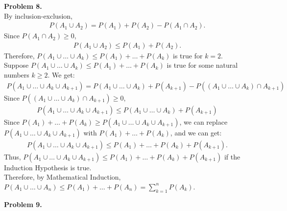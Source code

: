 \documentclass{article}
\begin{document}
\textbf{Problem 8.} \\
By inclusion-exclusion,
\begin{align}
    P(A_1 \cup A_2) = P(A_1) + P(A_2) - P(A_1 \cap A_2).
\end{align}
Since $P(A_1 \cap A_2) \ge 0$,
\begin{align}
    P(A_1 \cup A_2) \le P(A_1) + P(A_2).
\end{align}
Therefore, $P(A_1 \cup \dots \cup A_k) \le P(A_1) + \dots + P(A_k)$ is true for $k = 2$. \\
Suppose $P(A_1 \cup \dots \cup A_k) \le P(A_1) + \dots + P(A_k)$ is true for some natural numbers $k \ge 2$.
We get:
\begin{align}
    P(A_1 \cup \dots \cup A_k \cup A_{k+1}) = P(A_1 \cup \dots \cup A_k) + P(A_{k+1}) - P((A_1 \cup \dots \cup A_k) \cap A_{k+1}) 
\end{align}
Since $P((A_1 \cup \dots \cup A_k) \cap A_{k+1}) \ge 0$, 
\begin{align}
    P(A_1 \cup \dots \cup A_k \cup A_{k+1}) \le P(A_1 \cup \dots \cup A_k) + P(A_{k+1})
\end{align}
Since $P(A_1) + \dots + P(A_k) \ge P(A_1 \cup \dots \cup A_k \cup A_{k+1})$, we can replace $P(A_1 \cup \dots \cup A_k \cup A_{k+1})$ with $P(A_1) + \dots + P(A_k)$, and we can get:
\begin{align}
    P(A_1 \cup \dots \cup A_k \cup A_{k+1}) \le P(A_1) + \dots + P(A_k) + P(A_{k+1}).
\end{align}
Thus, $P(A_1 \cup \dots \cup A_k \cup A_{k+1}) \le P(A_1) + \dots + P(A_k) + P(A_{k+1})$ if the Induction Hypothesis is true. \\
Therefore, by Mathematical Induction, $P(A_1 \cup \dots \cup A_n) \le P(A_1) + \dots + P(A_n) = \sum_{k=1}^{n}P(A_k)$.

\textbf{Problem 9.}
\end{document}

